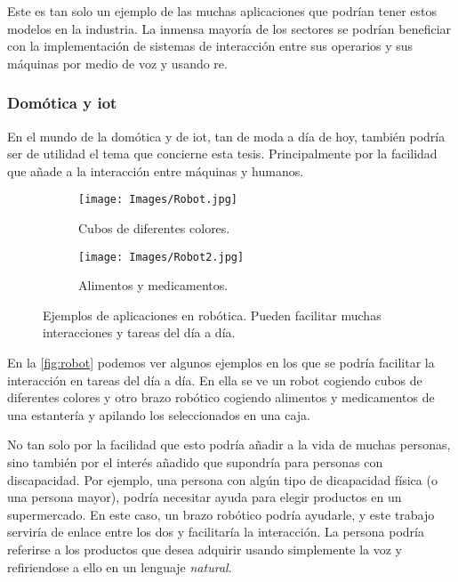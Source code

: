 Este es tan solo un ejemplo de las muchas aplicaciones que podrían tener estos
modelos en la industria. La inmensa mayoría de los sectores se podrían
beneficiar con la implementación de sistemas de interacción entre sus operarios
y sus máquinas por medio de voz y usando \gls{re}.

\subsubsection{Domótica y \acs*{iot}}
En el mundo de la domótica y de \gls{iot}, tan de moda a día de hoy, también
podría ser de utilidad el tema que concierne esta tesis. Principalmente por la
facilidad que añade a la interacción entre máquinas y humanos.

\begin{figure}[ht]
  \centering
  \begin{subfigure}[t]{.55\textwidth}
    \centering
    \caption{Cubos de diferentes colores.}
    \texttt{[image: Images/Robot.jpg]}
  \end{subfigure}\hfill
  \begin{subfigure}[t]{.4\textwidth}
    \centering
    \caption{Alimentos y medicamentos.}
    \texttt{[image: Images/Robot2.jpg]}
  \end{subfigure}
  \caption[Ejemplos de aplicaciones en robótica]{Ejemplos de aplicaciones en
    robótica. Pueden facilitar muchas interacciones y tareas del día a día.}
  \label{fig:robot}
\end{figure}

En la \vref{fig:robot} podemos ver algunos ejemplos en los que se podría
facilitar la interacción en tareas del día a día. En ella se ve un robot
cogiendo cubos de diferentes colores y otro brazo robótico cogiendo alimentos y
medicamentos de una estantería y apilando los seleccionados en una caja.

No tan solo por la facilidad que esto podría añadir a la vida de muchas
personas, sino también por el interés añadido que supondría para personas con
discapacidad. Por ejemplo, una persona con algún tipo de dicapacidad física (o
una persona mayor), podría necesitar ayuda para elegir productos en un
supermercado. En este caso, un brazo robótico podría ayudarle, y este trabajo
serviría de enlace entre los dos y facilitaría la interacción. La persona
podría referirse a los productos que desea adquirir usando simplemente la voz y
refiriendose a ello en un lenguaje \emph{natural}.

